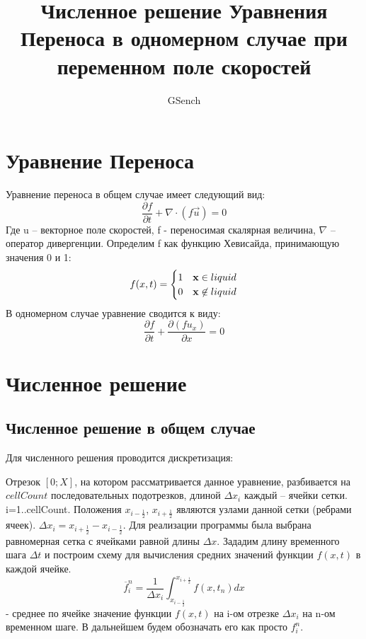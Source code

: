 \documentclass[10pt,a4paper]{article}
\author{GSench}
\title{Численное решение Уравнения Переноса в одномерном случае при переменном поле скоростей}
\begin{document}
\section{Уравнение Переноса}
Уравнение переноса в общем случае имеет следующий вид:
\begin{equation}
\frac{\partial f}{\partial t}+\nabla\cdot(f\overrightarrow{u})=0
\end{equation}
Где u – векторное поле скоростей, f - переносимая скалярная величина, $ \nabla $ – оператор дивергенции. Определим f как функцию Хевисайда, принимающую значения 0 и 1:
\begin{equation}
f(x,t)=\begin{cases}1 & {\bf x}\in liquid \\0 & {\bf x}\not\in liquid\end{cases}
\end{equation}
В одномерном случае уравнение сводится к виду:
\begin{equation}
\label{eqn:TE1D}
\frac{\partial f}{\partial t} + \frac{\partial (f u_{x})}{\partial x}=0
\end{equation}

\section{Численное решение}
\subsection{Численное решение в общем случае}
Для численного решения проводится дискретизация:

Отрезок $[0;X]$, на котором рассматривается данное уравнение, разбивается на $cellCount$ последовательных подотрезков, длиной $\Delta x_i$ каждый – ячейки сетки. i=1..cellCount. Положения $x_{i-\frac{1}{2}}$, $x_{i+\frac{1}{2}}$ являются узлами данной сетки (ребрами ячеек). $\Delta x_i=x_{i+\frac{1}{2}}-x_{i-\frac{1}{2}}$. Для реализации программы была выбрана равномерная сетка с ячейками равной длины $\Delta x$. Зададим длину временного шага $\Delta t$ и построим схему для вычисления средних значений функции $f(x,t)$ в каждой ячейке.
\begin{equation}
\overline{f}_i^n=\frac{1}{\Delta x_i}\int_{x_{i-\frac{1}{2}}}^{x_{i+\frac{1}{2}}}f(x,t_n)dx 
\end{equation}
- среднее по ячейке значение функции $f(x,t)$ на i-ом отрезке $\Delta x_i$ на n-ом временном шаге. В дальнейшем будем обозначать его как просто $f_i^n$.
\end{document}
